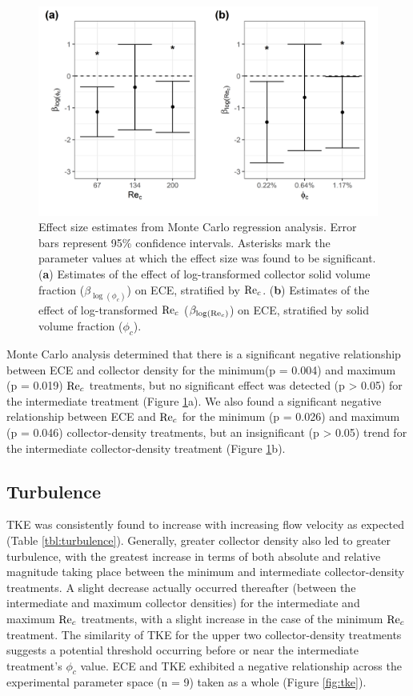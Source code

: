 \documentclass[geosciences,article,submit,moreauthors,pdftex]{Definitions/mdpi}
\begin{document}
\begin{figure}[H]
\centering
\includegraphics[width=5in]{../pics/montecarlo.png}
\caption{Effect size estimates from Monte Carlo regression analysis. Error bars represent 95\% confidence intervals. Asterisks mark the parameter values at which the effect size was found to be significant. (\textbf{a}) Estimates of the effect of log-transformed collector solid volume fraction ($\beta_{\log(\phi_c)}$) on ECE, stratified by $\mathrm{Re}_c$. (\textbf{b}) Estimates of the effect of log-transformed $\mathrm{Re}_c$ ($\beta_{\log(\mathrm{Re}_c)}$) on ECE, stratified by solid volume fraction ($\phi_c$).}
\label{fig:monte}
\end{figure}   

Monte Carlo analysis determined that there is a significant negative relationship between ECE and collector density for the minimum(p = 0.004) and maximum (p = 0.019) $\mathrm{Re}_c$ treatments, but no significant effect was detected (p > 0.05) for the intermediate treatment (Figure \ref{fig:monte}a). We also found a significant negative relationship between ECE and $\mathrm{Re}_c$ for the minimum (p = 0.026) and maximum (p = 0.046) collector-density treatments, but an insignificant (p > 0.05) trend for the intermediate collector-density treatment (Figure \ref{fig:monte}b). 

\subsection{Turbulence}

TKE was consistently found to increase with increasing flow velocity as expected (Table \ref{tbl:turbulence}). Generally, greater collector density also led to greater turbulence, with the greatest increase in terms of both absolute and relative magnitude taking place between the minimum and intermediate collector-density treatments. A slight decrease actually occurred thereafter (between the intermediate and maximum collector densities) for the intermediate and maximum $\mathrm{Re}_c$ treatments, with a slight increase in the case of the minimum $\mathrm{Re}_c$ treatment. The similarity of TKE for the upper two collector-density treatments suggests a potential threshold occurring before or near the intermediate treatment's $\phi_c$ value. ECE and TKE exhibited a negative relationship across the experimental parameter space (n = 9) taken as a whole (Figure \ref{fig:tke}).
\end{document}
